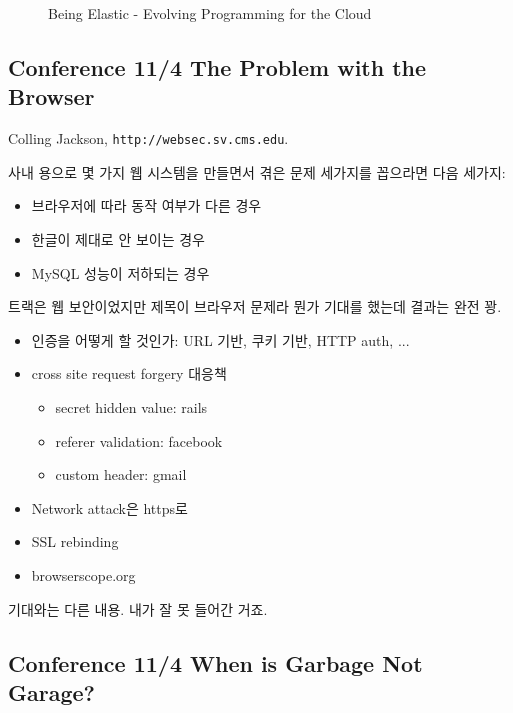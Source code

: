 \documentclass[a4paper]{article}
\begin{document}
\begin{figure}[t]
    \begin{Frame}
        \begin{center}
        \end{center}
    \end{Frame}
    \caption{Being Elastic - Evolving Programming for the Cloud}
    \label{cloud}
\end{figure}
 
\subsection{Conference 11/4 The Problem with the Browser}
 
Colling Jackson, \texttt{http://websec.sv.cms.edu}.
 
사내 용으로 몇 가지 웹 시스템을 만들면서 겪은 문제 세가지를 꼽으라면 다음 
세가지:
\begin{itemize}
\item 브라우저에 따라 동작 여부가 다른 경우
\item 한글이 제대로 안 보이는 경우
\item MySQL 성능이 저하되는 경우
\end{itemize}
 
트랙은 웹 보안이었지만 제목이 브라우저 문제라 뭔가 기대를 했는데 결과는 완전 꽝.
 
\begin{itemize}
\item 인증을 어떻게 할 것인가: URL 기반, 쿠키 기반, HTTP auth, ...
\item cross site request forgery 대응책
    \begin{itemize}
    \item secret hidden value: rails
    \item referer validation: facebook
    \item custom header: gmail
    \end{itemize}
\item Network  attack은 https로 
\item SSL rebinding
\item browserscope.org 
\end{itemize}
 
기대와는 다른 내용. 내가 잘 못 들어간 거죠.
 
\subsection{Conference 11/4 When is Garbage Not Garage?}
 
\end{document}
